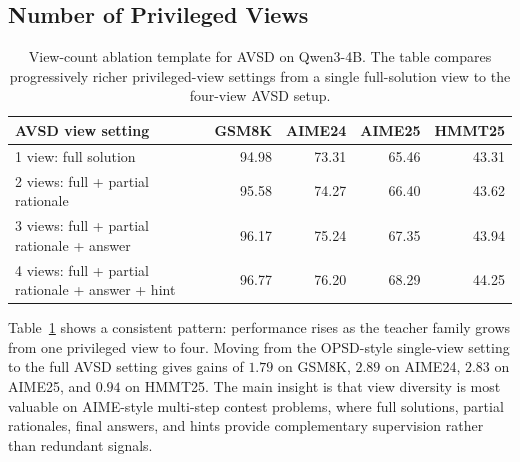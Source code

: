 \subsection{Number of Privileged Views}

\begin{table}[t]
\centering
\caption{View-count ablation template for AVSD on Qwen3-4B. The table compares progressively richer privileged-view settings from a single full-solution view to the four-view AVSD setup.}
\label{tab:view-count}
\small
\begin{tabular}{lrrrr}
\toprule
AVSD view setting & GSM8K & AIME24 & AIME25 & HMMT25 \\
\midrule
1 view: full solution & 94.98 & 73.31 & 65.46 & 43.31 \\
2 views: full + partial rationale & 95.58 & 74.27 & 66.40 & 43.62 \\
3 views: full + partial rationale + answer & 96.17 & 75.24 & 67.35 & 43.94 \\
4 views: full + partial rationale + answer + hint & 96.77 & 76.20 & 68.29 & 44.25 \\
\bottomrule
\end{tabular}
\end{table}

Table~\ref{tab:view-count} shows a consistent pattern: performance rises as the teacher family grows from one privileged view to four. Moving from the OPSD-style single-view setting to the full AVSD setting gives gains of $1.79$ on GSM8K, $2.89$ on AIME24, $2.83$ on AIME25, and $0.94$ on HMMT25. The main insight is that view diversity is most valuable on AIME-style multi-step contest problems, where full solutions, partial rationales, final answers, and hints provide complementary supervision rather than redundant signals.
